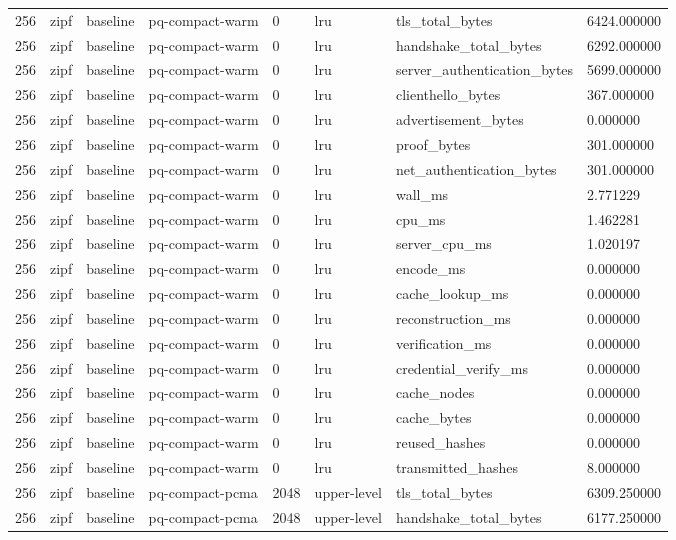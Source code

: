 \begin{tabular}{llllllll}
256 & zipf & baseline & pq-compact-warm & 0 & lru & tls\_total\_bytes & 6424.000000 \\
256 & zipf & baseline & pq-compact-warm & 0 & lru & handshake\_total\_bytes & 6292.000000 \\
256 & zipf & baseline & pq-compact-warm & 0 & lru & server\_authentication\_bytes & 5699.000000 \\
256 & zipf & baseline & pq-compact-warm & 0 & lru & clienthello\_bytes & 367.000000 \\
256 & zipf & baseline & pq-compact-warm & 0 & lru & advertisement\_bytes & 0.000000 \\
256 & zipf & baseline & pq-compact-warm & 0 & lru & proof\_bytes & 301.000000 \\
256 & zipf & baseline & pq-compact-warm & 0 & lru & net\_authentication\_bytes & 301.000000 \\
256 & zipf & baseline & pq-compact-warm & 0 & lru & wall\_ms & 2.771229 \\
256 & zipf & baseline & pq-compact-warm & 0 & lru & cpu\_ms & 1.462281 \\
256 & zipf & baseline & pq-compact-warm & 0 & lru & server\_cpu\_ms & 1.020197 \\
256 & zipf & baseline & pq-compact-warm & 0 & lru & encode\_ms & 0.000000 \\
256 & zipf & baseline & pq-compact-warm & 0 & lru & cache\_lookup\_ms & 0.000000 \\
256 & zipf & baseline & pq-compact-warm & 0 & lru & reconstruction\_ms & 0.000000 \\
256 & zipf & baseline & pq-compact-warm & 0 & lru & verification\_ms & 0.000000 \\
256 & zipf & baseline & pq-compact-warm & 0 & lru & credential\_verify\_ms & 0.000000 \\
256 & zipf & baseline & pq-compact-warm & 0 & lru & cache\_nodes & 0.000000 \\
256 & zipf & baseline & pq-compact-warm & 0 & lru & cache\_bytes & 0.000000 \\
256 & zipf & baseline & pq-compact-warm & 0 & lru & reused\_hashes & 0.000000 \\
256 & zipf & baseline & pq-compact-warm & 0 & lru & transmitted\_hashes & 8.000000 \\
256 & zipf & baseline & pq-compact-pcma & 2048 & upper-level & tls\_total\_bytes & 6309.250000 \\
256 & zipf & baseline & pq-compact-pcma & 2048 & upper-level & handshake\_total\_bytes & 6177.250000 \\

\end{tabular}
